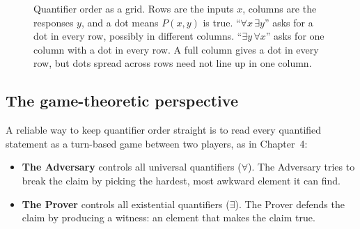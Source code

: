 \begin{figure}[htbp]
\centering
{}
\caption{Quantifier order as a grid. Rows are the inputs $x$, columns are the responses $y$, and a dot means $P(x, y)$ is true. ``$\forall x\, \exists y$'' asks for a dot in every row, possibly in different columns. ``$\exists y\, \forall x$'' asks for one column with a dot in every row. A full column gives a dot in every row, but dots spread across rows need not line up in one column.}
\label{fig:qo-grid}
\end{figure}

\subsection{The game-theoretic perspective}

A reliable way to keep quantifier order straight is to read every quantified statement as a turn-based game between two players, as in Chapter~4:
\begin{itemize}
\item \textbf{The Adversary} controls all universal quantifiers ($\forall$). The Adversary tries to break the claim by picking the hardest, most awkward element it can find.
\item \textbf{The Prover} controls all existential quantifiers ($\exists$). The Prover defends the claim by producing a witness: an element that makes the claim true.
\end{itemize}


